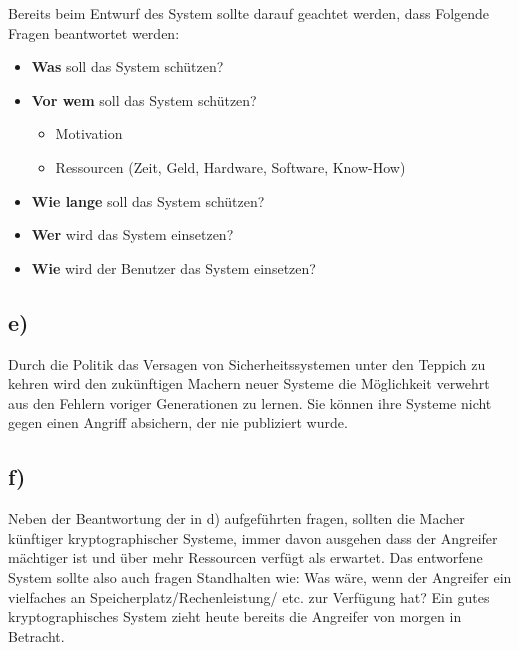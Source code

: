\documentclass[10pt,a4paper]{article}
\begin{document}
Bereits beim Entwurf des System sollte darauf geachtet werden, dass Folgende Fragen beantwortet werden:

\begin{itemize}
\item \textbf{Was} soll das System schützen?
\item \textbf{Vor wem} soll das System schützen?
\begin{itemize}
\item Motivation
\item Ressourcen (Zeit, Geld, Hardware, Software, Know-How)
\end{itemize}
\item \textbf{Wie lange} soll das System schützen?
\item \textbf{Wer} wird das System einsetzen?
\item \textbf{Wie} wird der Benutzer das System einsetzen?
\end{itemize}

\subsection*{e)}
Durch die Politik das Versagen von Sicherheitssystemen unter den Teppich zu kehren wird den zukünftigen Machern neuer Systeme die Möglichkeit verwehrt aus den Fehlern voriger Generationen zu lernen. Sie können ihre Systeme nicht gegen
einen Angriff absichern, der nie publiziert wurde. 

\subsection*{f)}
Neben der Beantwortung der in d) aufgeführten fragen, sollten die Macher künftiger kryptographischer Systeme, immer davon ausgehen dass der Angreifer mächtiger ist und über mehr Ressourcen verfügt als erwartet. Das entworfene System sollte also auch fragen Standhalten wie:  Was wäre, wenn der Angreifer ein vielfaches an Speicherplatz/Rechenleistung/ etc. zur Verfügung hat?
Ein gutes kryptographisches System zieht heute bereits die Angreifer von morgen in Betracht.
\end{document}
